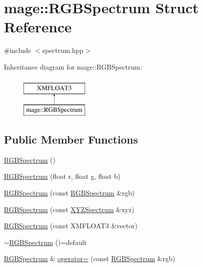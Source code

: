 \hypertarget{structmage_1_1_r_g_b_spectrum}{}\section{mage\+:\+:R\+G\+B\+Spectrum Struct Reference}
\label{structmage_1_1_r_g_b_spectrum}


{\ttfamily \#include $<$spectrum.\+hpp$>$}

Inheritance diagram for mage\+:\+:R\+G\+B\+Spectrum\+:\begin{figure}[H]
\begin{center}
\leavevmode
\includegraphics[height=2.000000cm]{structmage_1_1_r_g_b_spectrum}
\end{center}
\end{figure}
\subsection*{Public Member Functions}
\begin{DoxyCompactItemize}
\item 
\hyperlink{structmage_1_1_r_g_b_spectrum_ac9ebcf270e9572fd0af180f50b7ceb10}{R\+G\+B\+Spectrum} ()
\item 
\hyperlink{structmage_1_1_r_g_b_spectrum_aae798159a0ea02e95347918ef881b3aa}{R\+G\+B\+Spectrum} (float r, float g, float b)
\item 
\hyperlink{structmage_1_1_r_g_b_spectrum_a5cf405a5fbaa641a421df5767d2847b4}{R\+G\+B\+Spectrum} (const \hyperlink{structmage_1_1_r_g_b_spectrum}{R\+G\+B\+Spectrum} \&rgb)
\item 
\hyperlink{structmage_1_1_r_g_b_spectrum_a7c87ee10a81c55b1954915c1abea0cb9}{R\+G\+B\+Spectrum} (const \hyperlink{structmage_1_1_x_y_z_spectrum}{X\+Y\+Z\+Spectrum} \&xyz)
\item 
\hyperlink{structmage_1_1_r_g_b_spectrum_af2837c778d5aa9b065f5b8b0a039fa02}{R\+G\+B\+Spectrum} (const X\+M\+F\+L\+O\+A\+T3 \&vector)
\item 
\hyperlink{structmage_1_1_r_g_b_spectrum_a7c18a007349953b1e4711a4856680b02}{$\sim$\+R\+G\+B\+Spectrum} ()=default
\item 
\hyperlink{structmage_1_1_r_g_b_spectrum}{R\+G\+B\+Spectrum} \& \hyperlink{structmage_1_1_r_g_b_spectrum_ac90d49aae8bfb98fa979d879fadd7968}{operator=} (const \hyperlink{structmage_1_1_r_g_b_spectrum}{R\+G\+B\+Spectrum} \&rgb)
\end{DoxyCompactItemize}


